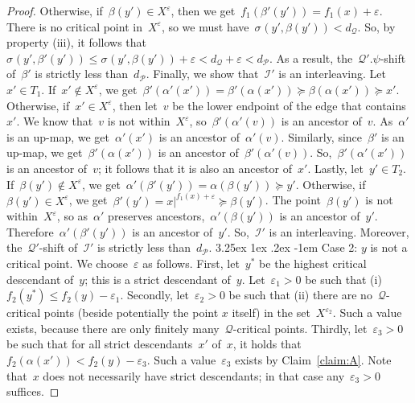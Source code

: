 \documentclass[11pt]{article}
\makeatletter
\newcommand{\an}[2]{#1|^{#2}}
\newcommand{\shift}[1]{\sigma_{#1}}
\newcommand{\resdist}[1]{d_{#1}}
\newcommand{\eps}{\varepsilon}
\newcommand{\I}{\mathcal{I}}
\renewcommand{\P}{\mathcal{P}}
\newcommand{\Q}{\mathcal{Q}}
\newcommand{\proofsubparagraph}{\@startsection{subparagraph}{5}{\z@}%
                                       {3.25ex \@plus1ex \@minus .2ex}%
                                       {-1em}%
                                      {\color{lipicsGray}\sffamily\normalsize\bfseries}}
\makeatother
\begin{document}
\begin{proof}
    Otherwise, if~$\beta(y') \in X^\eps$, then we get~$f_1(\beta'(y')) = f_1(x) + \eps$.
    There is no critical point in~$X^\eps$, so we must have~$\shift{}(y', \beta(y')) < \resdist{\Q}$.
    So, by property (iii), it follows that~$\shift{}(y', \beta'(y')) \le \shift{}(y', \beta(y')) + \eps < \resdist{\Q} + \eps < \resdist{\P}$.
    As a result, the~$\Q'.\psi$-shift of~$\beta'$ is strictly less than~$\resdist{\P}$.
%
    Finally, we show that~$\I'$ is an interleaving.
    Let~$x' \in T_1$.
    If~$x' \notin X^\eps$, we get~$\beta'(\alpha'(x')) = \beta'(\alpha(x')) \succeq \beta(\alpha(x')) \succeq x'$.
    Otherwise, if~$x' \in X^\eps$, then let~$v$ be the lower endpoint of the edge that contains~$x'$.
    We know that~$v$ is not within~$X^\eps$, so~$\beta'(\alpha'(v))$ is an ancestor of~$v$.
    As~$\alpha'$ is an up-map, we get~$\alpha'(x')$ is an ancestor of~$\alpha'(v)$.
    Similarly, since~$\beta'$ is an up-map, we get~$\beta'(\alpha(x'))$ is an ancestor of~$\beta'(\alpha'(v))$.
    So,~$\beta'(\alpha'(x'))$ is an ancestor of~$v$; it follows that it is also an ancestor of~$x'$.
    Lastly, let~$y' \in T_2$.
    If~$\beta(y') \notin X^\eps$, we get~$\alpha'(\beta'(y')) = \alpha(\beta(y')) \succeq y'$.
    Otherwise, if~$\beta(y') \in X^\eps$, we get~$\beta'(y') = \an{x}{f_1(x) + \eps} \succeq \beta(y')$.
    The point~$\beta(y')$ is not within~$X^\eps$, so as~$\alpha'$ preserves ancestors,~$\alpha'(\beta(y'))$ is an ancestor of~$y'$.
    Therefore~$\alpha'(\beta'(y'))$ is an ancestor of~$y'$.
    So,~$\I'$ is an interleaving.
    Moreover, the~$\Q'$-shift of~$\I'$ is strictly less than~$\resdist{\P}$.
%
    \proofsubparagraph{Case 2: $y$ is not a critical point.}
    We choose~$\eps$ as follows.
    First, let~$y^*$ be the highest critical descendant of~$y$; this is a strict descendant of~$y$.
    Let~$\eps_1 > 0$ be such that (i) $f_2(y^*) \le f_2(y) - \eps_1$.
    Secondly, let~$\eps_2 > 0$ be such that (ii) there are no~$\Q$-critical points (beside potentially the point $x$ itself) in the set~$X^{\eps_2}$.
    Such a value exists, because there are only finitely many~$\Q$-critical points.
    Thirdly, let~$\eps_3 > 0$ be such that for all strict descendants~$x'$ of~$x$, it holds that~$f_2(\alpha(x')) < f_2(y) - \eps_3$.
    Such a value~$\eps_3$ exists by Claim~\ref{claim:A}.
    Note that~$x$ does not necessarily have strict descendants; in that case any~$\eps_3 > 0$ suffices.

\end{proof}
\end{document}
